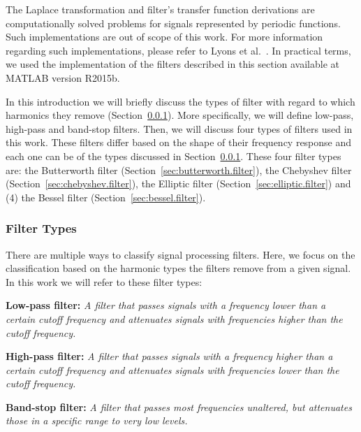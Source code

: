 The Laplace transformation and filter's transfer function derivations are computationally solved problems for signals represented by periodic functions. Such implementations are out of scope of this work. For more information regarding such implementations, please refer to Lyons et al.~\cite{lyons2010}. In practical terms, we used the implementation of the filters described in this section available at MATLAB version R2015b.

In this introduction we will briefly discuss the types of filter with regard to which harmonics they remove (Section~\ref{sec:filter.types}). More specifically, we will define low-pass, high-pass and band-stop filters. Then, we will discuss four types of filters used in this work. These filters differ based on the shape of their frequency response and each one can be of the types discussed in Section~\ref{sec:filter.types}. These four filter types are: the Butterworth filter (Section~\ref{sec:butterworth.filter}), the Chebyshev filter (Section~\ref{sec:chebyshev.filter}), the Elliptic filter (Section~\ref{sec:elliptic.filter}) and (4) the Bessel filter (Section~\ref{sec:bessel.filter}).

\subsubsection{Filter Types}
\label{sec:filter.types}

There are multiple ways to classify signal processing filters. Here, we focus on the classification based on the harmonic types the filters remove from a given signal. In this work we will refer to these filter types:

\vspace{0.5cm}
\noindent
\textbf{Low-pass filter:} \emph{A filter that passes signals with a frequency lower than a certain cutoff frequency and attenuates signals with frequencies higher than the cutoff frequency.}

\noindent
\textbf{High-pass filter:} \emph{A filter that passes signals with a frequency higher than a certain cutoff frequency and attenuates signals with frequencies lower than the cutoff frequency.}

\noindent
\textbf{Band-stop filter:} \emph{A filter that passes most frequencies unaltered, but attenuates those in a specific range to very low levels.}
\vspace{0.45cm}

